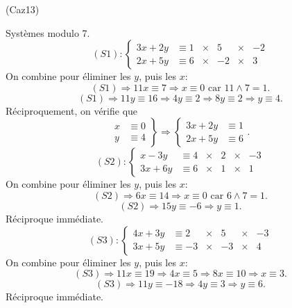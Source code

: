 \begin{tiny}(Caz13)\end{tiny} Systèmes modulo 7.
\[
 (S1): 
 \left\lbrace 
\begin{aligned}
  3 x + 2y &\equiv 1 &\times& 5  &\times& -2 \\
  2x + 5y  &\equiv 6 &\times& -2 &\times& 3 
\end{aligned}
\right. 
\]
On combine pour éliminer les $y$, puis les $x$:
\[
  (S1) \Rightarrow 11 x \equiv 7  \Rightarrow x \equiv 0 \text{ car } 11 \wedge 7 = 1.
\]
\[
  (S1) \Rightarrow 11 y \equiv 16  \Rightarrow 4y \equiv 2 \Rightarrow 8y \equiv 2
  \Rightarrow y \equiv 4. 
\]
Réciproquement, on vérifie que
\[
  \left. 
  \begin{aligned}
    x &\equiv 0 \\ y &\equiv 4
  \end{aligned}
\right\rbrace
\Rightarrow
 \left\lbrace 
\begin{aligned}
  3 x + 2y &\equiv 1  \\
  2x + 5y  &\equiv 6 
\end{aligned}
\right. .
\]
\[
 (S2): 
 \left\lbrace 
\begin{aligned}
  x - 3y &\equiv 4   &\times& 2  &\times& -3 \\
  3x + 6y  &\equiv 6 &\times& 1  &\times& 1 
\end{aligned}
\right. 
\]
On combine pour éliminer les $y$, puis les $x$:
\[
  (S2) \Rightarrow 6 x \equiv 14  \Rightarrow x \equiv 0 \text{ car } 6 \wedge 7 = 1.
\]
\[
  (S2) \Rightarrow 15 y \equiv -6  \Rightarrow y \equiv 1. 
\]
Réciproque immédiate.
\[
 (S3): 
 \left\lbrace 
\begin{aligned}
  4x + 3y &\equiv 2   &\times& 5   &\times& -3 \\
  3x + 5y  &\equiv -3  &\times& -3  &\times& 4 
\end{aligned}
\right. 
\]
On combine pour éliminer les $y$, puis les $x$:
\[
  (S3) \Rightarrow 11 x \equiv 19  \Rightarrow 4x \equiv 5 \Rightarrow 8x \equiv 10 \Rightarrow x \equiv 3.
\]
\[
  (S3) \Rightarrow 11 y \equiv -18  \Rightarrow 4y \equiv 3 \Rightarrow y \equiv 6 . 
\]
Réciproque immédiate.
